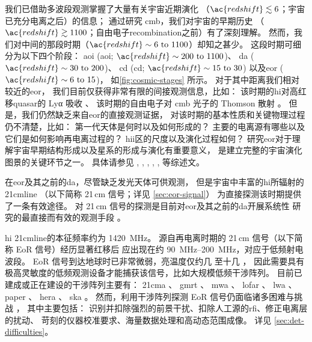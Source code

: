 我们已借助多波段观测掌握了大量有关宇宙近期演化
（$\ac{redshift} \lesssim 6$；宇宙已充分电离之后）的信息；
通过研究 \ac{cmb}，我们对宇宙的早期历史
（$\ac{redshift} \gtrsim 1100$；自由电子\ac{recombination}之前）有了深刻理解。
然而，我们对中间的那段时期（$\ac{redshift} \sim \numrange{6}{1100}$）却知之甚少。
这段时期可细分为以下四个阶段\cite{koopmans2015}：
\acs{aoi} (\acl{aoi}; $\ac{redshift} \sim \numrange{200}{1100}$)、
\acs{da} ($\ac{redshift} \sim \numrange{30}{200}$)、
\acs{cd} (\acl{cd}; $\ac{redshift} \sim \numrange{15}{30}$)
以及\acl{eor} ($\ac{redshift} \sim \numrange{6}{15}$)，
如\autoref{fig:cosmic-stages} 所示。
对于其中距离我们相对较近的\acl{eor}，
我们目前仅获得非常有限的间接观测信息，比如：
该时期的\ac{hi}对高红移\ac{quasar}的 Lyα 吸收 \cite{becker2001}、
该时期的自由电子对 \ac{cmb} 光子的 Thomson 散射 \cite{kaplinghat2003}。
但是，我们仍然缺乏来自\acl{eor}的直接观测证据，
对该时期的基本性质和关键物理过程仍不清楚，比如：
第一代天体是何时以及如何形成的？
主要的电离源有哪些以及它们是如何影响再电离过程的？
\ac{hii}区的尺度以及演化过程如何？
研究\acl{eor}对于理解宇宙早期结构形成以及星系的形成与演化有重要意义，
是建立完整的宇宙演化图景的关键环节之一。
具体请参见 , ,
, ,
,  等综述文。

在\acl{eor}及其之前的\ac{da}，尽管缺乏发光天体可供观测，
但是宇宙中丰富的\ac{hi}所辐射的 \ac{21cmline}
（以下简称 21\,cm 信号；详见 \autoref{sec:eor-signal}）
为直接探测该时期提供了一条有效途径。
对 21\,cm 信号的探测是目前对\acl{eor}及其之前的\ac{da}开展系统性
研究的最直接而有效的观测手段
\cite{madau1997,tozzi2000,furlanetto2006,koopmans2015,furlanetto2016}。

\ac{hi} \ac{21cmline}的本征频率约为 \SI{1420}{\MHz}。
源自再电离时期的 21\,cm 信号（以下简称 EoR 信号）经历显著红移后
应出现在约 \SIrange{90}{200}{\MHz}，对应于低频射电波段。
EoR 信号到达地球时已非常微弱，亮温度仅约几 \si{\mK} 至十几 \si{\mK}，
因此需要具有极高灵敏度的低频观测设备才能捕获该信号，比如大规模低频干涉阵列。
目前已建成或正在建设的干涉阵列主要有：
\ac{21cma} \cite{zheng2016}、
\ac{gmrt} \cite{paciga2011}、
\ac{mwa} \cite{bowman2013,tingay2013}、
\ac{lofar} \cite{vanHaarlem2013}、
\ac{lwa} \cite{ellingson2009}、
\ac{paper} \cite{parsons2010}、
\ac{hera} \cite{deBoer2017}、
\ac{ska} \cite{mellema2013,koopmans2015}。
然而，利用干涉阵列探测 EoR 信号仍面临诸多困难与挑战
\cite{morales2010,wijnholds2010}，
其中主要包括：
识别并扣除强烈的前景干扰、扣除人工源的\ac{rfi}、修正电离层的扰动、
苛刻的仪器校准要求、海量数据处理和高动态范围成像。
详见 \autoref{sec:det-difficulties}。

